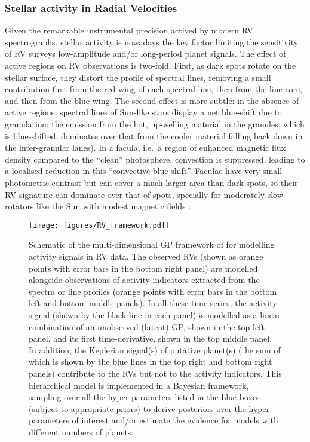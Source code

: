 \documentclass[letterpaper]{ar-1col}
\begin{document}
\subsubsection{Stellar activity in Radial Velocities} \label{sec:RVact}
Given the remarkable instrumental precision actived by modern RV spectrographs, stellar activity is nowadays the key factor limiting the sensitivity of RV surveys low-amplitude and/or long-period planet signals. The effect of active regions on RV observations is two-fold. First, as dark spots rotate on the stellar surface, they distort the profile of spectral lines, removing a small contribution first from the red wing of each spectral line, then from the line core, and then from the blue wing. The second effect is more subtle: in the absence of active regions, spectral lines of Sun-like stars display a net blue-shift due to granulation: the emission from the hot, up-welling material in the granules, which is blue-shifted, dominates over that from the cooler material falling back down in the inter-granular lanes). In a facula, i.e.\ a region of enhanced magnetic flux density compared to the ``clean'' photosphere, convection is suppressed, leading to a localised reduction in this ``convective blue-shift''. Faculae have very small photometric contrast but can cover a much larger area than dark spots, so their RV signature can dominate over that of spots, specially for moderately slow rotators like the Sun with modest magnetic fields \citep{2010A&A...512A..39M}.

\begin{figure}[ht]
  \texttt{[image: figures/RV\_framework.pdf]}
  \caption{Schematic of the multi-dimensional GP framework of \citet{2015MNRAS.452.2269R} for modelling activity signals in RV data. The observed RVs (shown as orange points with error bars in the bottom right panel) are modelled alongside observations of activity indicators extracted from the spectra or line profiles (orange points with error bars in the bottom left and bottom middle panels). In all these time-series, the activity signal (shown by the black line in each panel) is modelled as a linear combination of an unobserved (latent) GP, shown in the top-left panel, and its first time-derivative, shown in the top middle panel. In addition, the Keplerian signal(s) of putative planet(s) (the sum of which is shown by the blue lines in the top right and bottom right panels) contribute to the RVs but not to the activity indicators. This hierarchical model is implemented in a Bayesian framework, sampling over all the hyper-parameters listed in the blue boxes (subject to appropriate priors) to derive posteriors over the hyper-parameters of interest and/or estimate the evidence for models with different numbers of planets. }
  \label{fig:RV_framework}
\end{figure}
\end{document}
